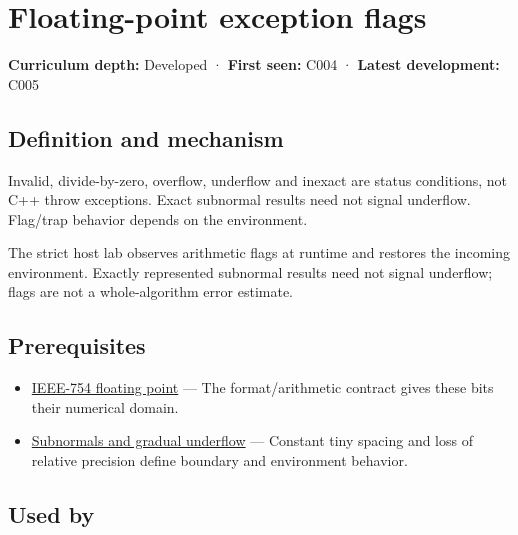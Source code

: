 \hypertarget{appendix-ed8531b46754}{}\label{referencestart:appendix-ed8531b46754}
\section{Floating-point exception flags}\label{appendix-ed8531b46754-floating-point-exception-flags}

\textbf{Curriculum depth:} Developed · \textbf{First seen:} C004 · \textbf{Latest development:} C005

\begin{allmightroledefinition}

\subsection{Definition and mechanism}\label{appendix-ed8531b46754-definition-and-mechanism}

Invalid, divide-by-zero, overflow, underflow and inexact are status conditions, not C++ throw exceptions. Exact subnormal results need not signal underflow. Flag/trap behavior depends on the environment.

\end{allmightroledefinition}

The strict host lab observes arithmetic flags at runtime and restores the incoming environment. Exactly represented subnormal results need not signal underflow; flags are not a whole-algorithm error estimate.

\subsection{Prerequisites}\label{appendix-ed8531b46754-prerequisites}

\begin{itemize}
\tightlist
\item
  \hyperref[appendix-343615f49ddf]{IEEE-754 floating point} --- The format/arithmetic contract gives these bits their numerical domain.
\item
  \hyperref[appendix-00a6e044c437]{Subnormals and gradual underflow} --- Constant tiny spacing and loss of relative precision define boundary and environment behavior.
\end{itemize}

\subsection{Used by}\label{appendix-ed8531b46754-used-by}

